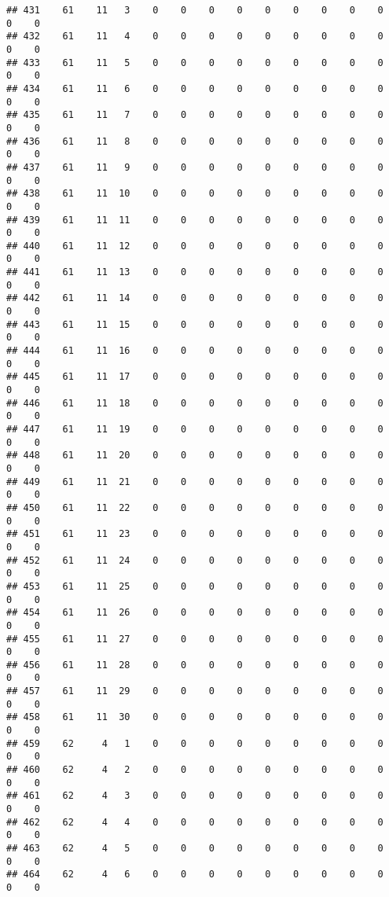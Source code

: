 \documentclass[]{article}
\begin{document}
\begin{verbatim}
## 431    61    11   3    0    0    0    0    0    0    0    0    0    0    0
## 432    61    11   4    0    0    0    0    0    0    0    0    0    0    0
## 433    61    11   5    0    0    0    0    0    0    0    0    0    0    0
## 434    61    11   6    0    0    0    0    0    0    0    0    0    0    0
## 435    61    11   7    0    0    0    0    0    0    0    0    0    0    0
## 436    61    11   8    0    0    0    0    0    0    0    0    0    0    0
## 437    61    11   9    0    0    0    0    0    0    0    0    0    0    0
## 438    61    11  10    0    0    0    0    0    0    0    0    0    0    0
## 439    61    11  11    0    0    0    0    0    0    0    0    0    0    0
## 440    61    11  12    0    0    0    0    0    0    0    0    0    0    0
## 441    61    11  13    0    0    0    0    0    0    0    0    0    0    0
## 442    61    11  14    0    0    0    0    0    0    0    0    0    0    0
## 443    61    11  15    0    0    0    0    0    0    0    0    0    0    0
## 444    61    11  16    0    0    0    0    0    0    0    0    0    0    0
## 445    61    11  17    0    0    0    0    0    0    0    0    0    0    0
## 446    61    11  18    0    0    0    0    0    0    0    0    0    0    0
## 447    61    11  19    0    0    0    0    0    0    0    0    0    0    0
## 448    61    11  20    0    0    0    0    0    0    0    0    0    0    0
## 449    61    11  21    0    0    0    0    0    0    0    0    0    0    0
## 450    61    11  22    0    0    0    0    0    0    0    0    0    0    0
## 451    61    11  23    0    0    0    0    0    0    0    0    0    0    0
## 452    61    11  24    0    0    0    0    0    0    0    0    0    0    0
## 453    61    11  25    0    0    0    0    0    0    0    0    0    0    0
## 454    61    11  26    0    0    0    0    0    0    0    0    0    0    0
## 455    61    11  27    0    0    0    0    0    0    0    0    0    0    0
## 456    61    11  28    0    0    0    0    0    0    0    0    0    0    0
## 457    61    11  29    0    0    0    0    0    0    0    0    0    0    0
## 458    61    11  30    0    0    0    0    0    0    0    0    0    0    0
## 459    62     4   1    0    0    0    0    0    0    0    0    0    0    0
## 460    62     4   2    0    0    0    0    0    0    0    0    0    0    0
## 461    62     4   3    0    0    0    0    0    0    0    0    0    0    0
## 462    62     4   4    0    0    0    0    0    0    0    0    0    0    0
## 463    62     4   5    0    0    0    0    0    0    0    0    0    0    0
## 464    62     4   6    0    0    0    0    0    0    0    0    0    0    0

\end{verbatim}
\end{document}
